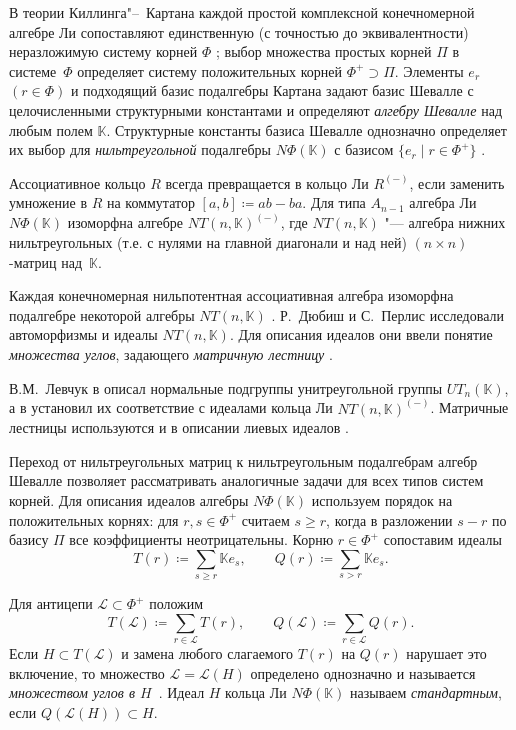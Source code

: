 {\actuality} В теории Киллинга"--~Картана каждой простой комплексной
конечномерной алгебре Ли сопоставляют единственную (с точностью до
эквивалентности) неразложимую систему корней $\Phi$ \cite[глава~3]{carter72};
выбор множества простых корней $\Pi$ в \ifsynopsis системе~\fi$\Phi$ определяет
систему положительных корней $\Phi^+\supset\Pi$. Элементы $e_r$ $(r\in\Phi)$ и
подходящий базис подалгебры Картана задают \cite{Chev-55} базис Шевалле с
целочисленными структурными константами и определяют \emph{алгебру Шевалле} над
любым полем $\mathbb{K}$. Структурные константы базиса Шевалле однозначно
определяет их выбор для \emph{нильтреугольной} подалгебры $N\Phi(\mathbb{K})$ с
базисом $\{e_r\mid r\in\Phi^+\}$ \cite[\S~4.2]{carter72}.

Ассоциативное кольцо $R$ всегда превращается в кольцо Ли $R^{(-)}$, если
заменить умножение в $R$ на коммутатор $[a,b]\coloneq ab-ba$. Для типа
$A_{n-1}$ алгебра Ли $N\Phi(\mathbb{K})$ изоморфна алгебре
$NT(n,\mathbb{K})^{(-)}$, где $NT(n,\mathbb{K})$ "--- алгебра нижних
нильтреугольных (т.\:е. с нулями на главной диагонали и над ней) $(n\times
n)$-матриц над~$\mathbb{K}$.

Каждая конечномерная нильпотентная ассоциативная алгебра изоморфна подалгебре
некоторой алгебры $NT(n,\mathbb{K})$ \cite[теорема~1]{Dub-Perl-1951}. Р.~Дюбиш
и С.~Перлис исследовали автоморфизмы и идеалы $NT(n,\mathbb{K})$. Для описания
идеалов они ввели понятие \emph{множества углов}, задающего \emph{матричную
    лестницу} \cite[\S~7, теорема~9]{Dub-Perl-1951}.

В.\:М.~Левчук в \cite[теорема~4]{vL74} описал нормальные подгруппы
унитреугольной группы $UT_n(\mathbb{K})$, а в \cite[теорема~1]{vL76} установил
их соответствие с идеалами кольца Ли $NT(n,\mathbb{K})^{(-)}$. Матричные
лестницы используются и в описании лиевых идеалов \cite[\S~2]{vL76}.

Переход от нильтреугольных матриц к нильтреугольным подалгебрам алгебр Шевалле
позволяет рассматривать аналогичные задачи для всех типов систем корней. Для
описания идеалов алгебры $N\Phi(\mathbb{K})$ используем порядок на
положительных корнях: для $r,s\in\Phi^+$ считаем $s\geq r$, когда в разложении
$s-r$ по базису $\Pi$ все коэффициенты неотрицательны. Корню $r\in\Phi^+$
сопоставим идеалы
\[
    T(r)\coloneq\sum_{s\geq r}\mathbb{K}e_s,\qquad
    Q(r)\coloneq\sum_{s>r}\mathbb{K}e_s.
\]

Для антицепи $\mathcal{L}\subset\Phi^+$ положим
\[
    T(\mathcal{L})\coloneq\sum_{r\in\mathcal{L}}T(r),\qquad
    Q(\mathcal{L})\coloneq\sum_{r\in\mathcal{L}}Q(r).
\]
Если $H\subset T(\mathcal{L})$ и замена любого слагаемого $T(r)$ на $Q(r)$
нарушает это включение, то множество $\mathcal{L}=\mathcal{L}(H)$ определено
однозначно и называется \emph{множеством углов в $H$}~\cite[\S~6]{Lev1992}.
Идеал $H$ кольца Ли $N\Phi(\mathbb{K})$ называем \emph{стандартным}, если
$Q(\mathcal{L}(H))\subset H$.

